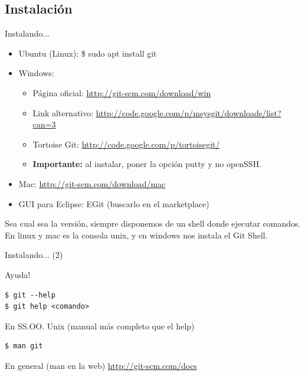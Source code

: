 \documentclass{beamer}
\begin{document}
\subsection{Instalación}
\begin{frame}[fragile]{Instalando...} 
  \begin{block}{}
      \begin{itemize}
      \item Ubuntu (Linux): \$ sudo apt install git \pause
	\item	 Windows: \begin{itemize}
			\item Página oficial: \url{http://git-scm.com/download/win} 
			\item Link alternativo: \url{http://code.google.com/p/msysgit/downloads/list?can=3}
		\item Tortoise Git: \url{http://code.google.com/p/tortoisegit/}
			\item \textbf{Importante:} al instalar, poner la opción putty y no openSSH.
		      \end{itemize} \pause
      \item Mac: \url{http://git-scm.com/download/mac} \pause
      \item GUI para Eclipse: EGit (buscarlo en el marketplace)
      \end{itemize}
  
    Sea cual sea la versión, siempre disponemos de un shell donde ejecutar comandos. En linux y mac es la consola unix,
    y en windows nos instala el Git Shell. 
  \end{block}
  
\end{frame}

\begin{frame}[fragile]{Instalando... (2)}
  \begin{block}{Ayuda!}
    \begin{verbatim}
$ git --help
$ git help <comando>
     \end{verbatim}
  \end{block} \pause
  \begin{block}{En SS.OO. Unix (manual más completo que el help)}
    \begin{verbatim}
$ man git
     \end{verbatim}
  \end{block} \pause
  \begin{block}{En general (man en la web)}
    \url{http://git-scm.com/docs}
  \end{block}
\end{frame}
\end{document}
